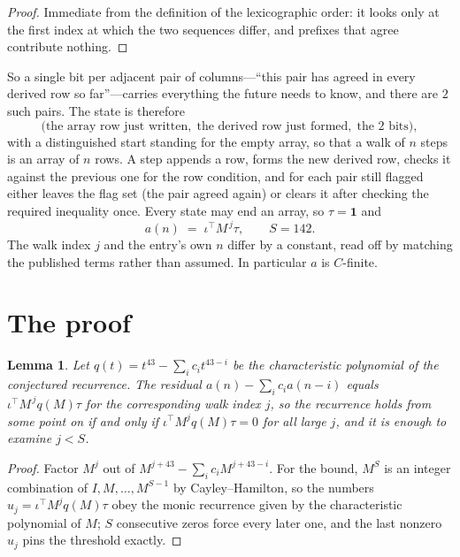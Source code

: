 \documentclass[11pt,a4paper]{article}
\theoremstyle{plain}
\newtheorem{lemma}[theorem]{Lemma}
\theoremstyle{definition}
\begin{document}
\begin{proof}
Immediate from the definition of the lexicographic order: it looks only at the first index at
which the two sequences differ, and prefixes that agree contribute nothing.
\end{proof}

So a single bit per adjacent pair of columns---``this pair has agreed in every derived row so
far''---carries everything the future needs to know, and there are $2$ such pairs. The state
is therefore
\[
\bigl(\text{the array row just written},\; \text{the derived row just formed},\;
\text{the 2 bits}\bigr),
\]
with a distinguished start standing for the empty array, so that a walk of $n$ steps is an array
of $n$ rows. A step appends a row, forms the new derived row, checks it against the previous one
for the row condition, and for each pair still flagged either leaves the flag set (the pair
agreed again) or clears it after checking the required inequality once. Every state may end an
array, so $\tau=\mathbf{1}$ and
\[
a(n)\;=\;\iota^{\!\top}M^{\,j}\tau ,\qquad S=142.
\]
The walk index $j$ and the entry's own $n$ differ by a constant, read off by matching the
published terms rather than assumed. In particular $a$ is $C$-finite.

\section{The proof}

\begin{lemma}\label{lem:crit}
Let $q(t)=t^{43}-\sum_i c_it^{43-i}$ be the characteristic polynomial of the
conjectured recurrence. The residual $a(n)-\sum_ic_ia(n-i)$ equals
$\iota^{\!\top}M^{\,j}q(M)\tau$ for the corresponding walk index $j$, so the recurrence
holds from some point on if and only if $\iota^{\!\top}M^{j}q(M)\tau=0$ for all large $j$,
and it is enough to examine $j<S$.
\end{lemma}

\begin{proof}
Factor $M^{j}$ out of $M^{j+43}-\sum_ic_iM^{j+43-i}$. For the bound, $M^{S}$
is an integer combination of $I,M,\dots,M^{S-1}$ by Cayley--Hamilton, so the numbers
$u_j=\iota^{\!\top}M^{j}q(M)\tau$ obey the monic recurrence given by the characteristic
polynomial of $M$; $S$ consecutive zeros force every later one, and the last nonzero $u_j$
pins the threshold exactly.
\end{proof}
\end{document}
